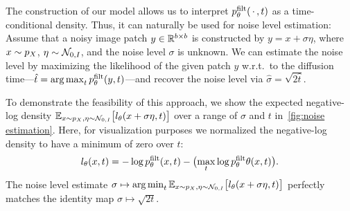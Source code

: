The construction of our model allows us to interpret \( p^{\mathrm{filt}}_\theta(\,\cdot\,, t) \) as a time-conditional density.
Thus, it can naturally be used for noise level estimation:
Assume that a noisy image patch \( y \in \mathbb{R}^{b \times b} \) is constructed by \( y = x + \sigma \eta \), where \( x \sim p_X \), \( \eta \sim \mathcal{N}_{\num{0}, I} \), and the noise level \( \sigma \) is unknown.
We can estimate the noise level by maximizing the likelihood of the given patch \( y \) w.r.t.\ to the diffusion time---\(\hat{t} = \operatorname*{arg\,max}_t p^{\mathrm{filt}}_\theta(y, t) \)---and recover the noise level via \( \hat{\sigma} = \sqrt{\num{2}\hat{t}} \).

To demonstrate the feasibility of this approach, we show the expected negative-log density \( \mathbb{E}_{x \sim p_X, \eta \sim \mathcal{N}_{\num{0}, I}} \bigl[ l_\theta(x + \sigma\eta, t) \bigr] \) over a range of \( \sigma \) and \( t \) in~\cref{fig:noise estimation}.
Here, for visualization purposes we normalized the negative-log density to have a minimum of zero over \( t \):
\begin{equation}
	l_\theta(x, t) = -\log p^{\mathrm{filt}}_\theta(x, t) - \bigl( \max_t \log p^{\mathrm{filt}}_\theta\theta(x, t) \bigr).
\end{equation}
The noise level estimate \( \sigma \mapsto \operatorname*{arg\,min}_t \mathbb{E}_{x \sim p_X, \eta \sim \mathcal{N}_{\num{0}, I}} \bigl[ l_\theta(x + \sigma\eta, t) \bigr] \) perfectly matches the identity map \( \sigma \mapsto \sqrt{\num{2}t} \).
\begin{sidefigure}
	\centering
	\caption[Noise estimation]{%
		Expected normalized negative log-density \( \sqrt{\num{2}t} \mapsto \mathbb{E}_{x \sim p_X, \eta \sim \NormalDistribution_{\num{0}, \Identity}} \bigl[ l_\theta(x + \sigma\eta, t) \bigr] \)  for different noise levels.
	}%
	\label{fig:noise estimation}
\end{sidefigure}

